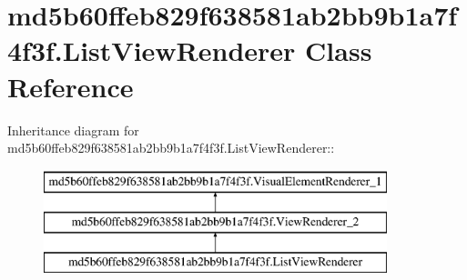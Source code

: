 \hypertarget{classmd5b60ffeb829f638581ab2bb9b1a7f4f3f_1_1_list_view_renderer}{
\section{md5b60ffeb829f638581ab2bb9b1a7f4f3f.ListViewRenderer Class Reference}
\label{classmd5b60ffeb829f638581ab2bb9b1a7f4f3f_1_1_list_view_renderer}
}
Inheritance diagram for md5b60ffeb829f638581ab2bb9b1a7f4f3f.ListViewRenderer::\begin{figure}[H]
\begin{center}
\leavevmode
\includegraphics[height=3cm]{classmd5b60ffeb829f638581ab2bb9b1a7f4f3f_1_1_list_view_renderer}
\end{center}
\end{figure}
